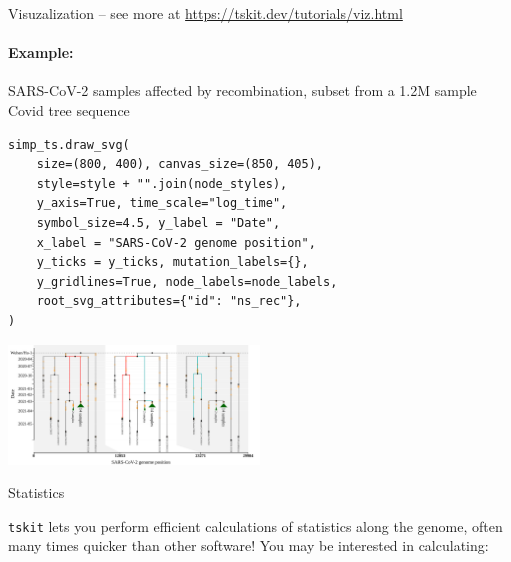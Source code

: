 \documentclass[landscape,a0paper,fontscale=0.4]{baposter}
\newcommand{\tskit}{{\texttt{tskit}}}
\begin{document}
\begin{poster}
\begin{posterbox}[name=viz,column=1,row=0,span=2,below=overview]{Visuzalization -- \textup{see more at \url{https://tskit.dev/tutorials/viz.html}}}
\begin{multicols}{2}

\columnbreak
\paragraph{Example:}
SARS-CoV-2 samples affected by recombination, subset from a 1.2M
sample Covid tree sequence
\begin{verbatim}
simp_ts.draw_svg(
    size=(800, 400), canvas_size=(850, 405),
    style=style + "".join(node_styles),
    y_axis=True, time_scale="log_time",
    symbol_size=4.5, y_label = "Date",
    x_label = "SARS-CoV-2 genome position",
    y_ticks = y_ticks, mutation_labels={},
    y_gridlines=True, node_labels=node_labels,
    root_svg_attributes={"id": "ns_rec"},
)
\end{verbatim}

\includegraphics[width=0.5\textwidth]{Covid_recombination}

\end{multicols}

\end{posterbox}



\begin{posterbox}[name=stats,column=3,row=0,span=1]{Statistics}

\tskit{} lets you perform efficient calculations of statistics along the genome, often many times quicker than other software! You may be interested in calculating:


\end{posterbox}
\end{poster}
\end{document}
